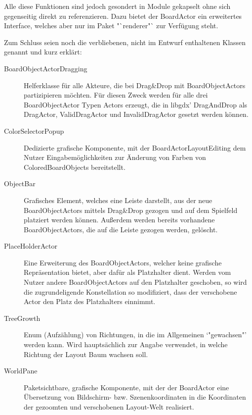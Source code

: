 Alle diese Funktionen sind jedoch gesondert in Module gekapselt ohne sich gegenseitig direkt zu referenzieren.
Dazu bietet der BoardActor ein erweitertes Interface, welches aber nur im Paket "`renderer"` zur Verfügung steht.


Zum Schluss seien noch die verbliebenen, nicht im Entwurf enthaltenen Klassen genannt und kurz erklärt:
\begin{description}
\item[BoardObjectActorDragging]
	Helferklasse für alle Akteure, die bei Drag&Drop mit BoardObjectActors partizipieren möchten.
	Für diesen Zweck werden für alle drei BoardObjectActor Typen Actors erzeugt, die in libgdx' DragAndDrop als DragActor, ValidDragActor und InvalidDragActor gesetzt werden können.
\item[ColorSelectorPopup]
	Dedizierte grafische Komponente, mit der BoardActorLayoutEditing dem Nutzer Eingabemöglichkeiten zur Änderung von Farben von ColoredBoardObjects bereitstellt.
\item[ObjectBar]
	Grafisches Element, welches eine Leiste darstellt, aus der neue BoardObjectActors mittels Drag&Drop gezogen und auf dem Spielfeld platziert werden können.
	Außerdem werden bereits vorhandene BoardObjectActors, die auf die Leiste gezogen werden, gelöscht.
\item[PlaceHolderActor]
	Eine Erweiterung des BoardObjectActors, welcher keine grafische Repräsentation bietet, aber dafür als Platzhalter dient.
	Werden vom Nutzer andere BoardObjectActors auf den Platzhalter geschoben, so wird die zugrundeligende Konstellation so modifiziert, dass der verschobene Actor den Platz des Platzhalters einnimmt.
\item[TreeGrowth]
	Enum (Aufzählung) von Richtungen, in die im Allgemeinen `"gewachsen"' werden kann. 
	Wird hauptsächlich zur Angabe verwendet, in welche Richtung der Layout Baum wachsen soll.
\item[WorldPane]
	Paketsichtbare, grafische Komponente, mit der der BoardActor eine Übersetzung von Bildschirm- bzw. Szenenkoordinaten in die Koordinaten der gezoomten und verschobenen Layout-Welt realisiert.
\end{description}
